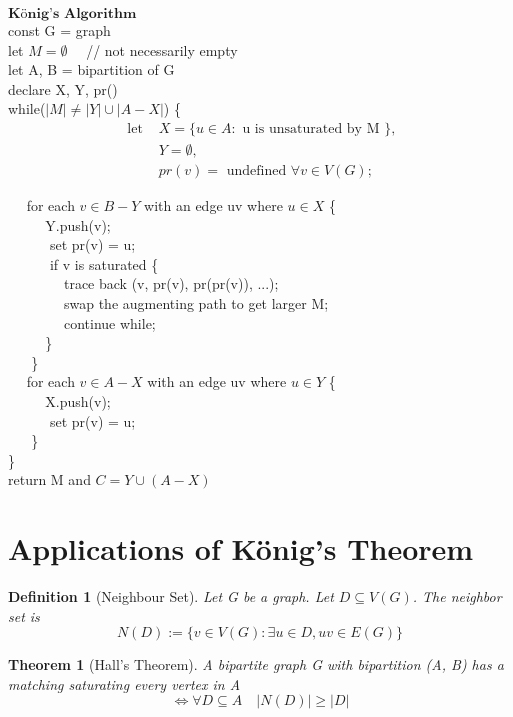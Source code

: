 \documentclass[11pt, oneside]{book}
\theoremstyle{break}
\newtheorem{thm}{Theorem}[section]
\newtheorem{defn}{Definition}[section]
\begin{document}
$\textbf{König's Algorithm}$ \\
const G = graph\\
let $M = \emptyset \quad$ // not necessarily empty\\
let A, B = bipartition of G\\
declare X, Y, pr()\\
while($|M| \neq |Y| \cup |A - X|$) \{
\begin{align*}
	\text{ let } &X = \{ u \in A : \text{ u is unsaturated by M } \}, \\
					   &Y = \emptyset, \\
					   &pr(v) = \text{ undefined } \forall v \in V(G);
\end{align*}

	$\quad$ for each $v \in B - Y$ with an edge uv where $u \in X$ \{\\
		$\text{ }\quad \quad$Y.push(v); \\
		$\text{ }\quad \quad$ set pr(v) = u;\\
		$ $\\
		$\text{ }\quad \quad$ if v is saturated \{\\
			$\text{ }\quad \quad \quad$ trace back (v, pr(v), pr(pr(v)), ...); \\
			$\text{ }\quad \quad \quad$ swap the augmenting path to get larger M;\\
			$\text{ }\quad \quad \quad$ continue while;\\
		$\text{ }\quad \quad$\}\\
	$\text{ }\quad$\}\\

	$\quad$ for each $v \in A - X$ with an edge uv where $u \in Y$ \{\\
		$\text{ }\quad \quad$X.push(v); \\
		$\text{ }\quad \quad$ set pr(v) = u; \\
	$\text{ }\quad$\}\\
\}\\
$ $\\
return M and $C = Y \cup (A - X)$

\section{Applications of König's Theorem}

\begin{defn}[Neighbour Set]
	Let G be a graph. Let $D \subseteq V(G)$. The neighbor set is
	\[
		N(D) := \{v \in V(G) : \exists u \in D, uv \in E(G)\}
	\]
\end{defn}

\begin{thm}[Hall's Theorem]
	A bipartite graph G with bipartition (A, B) has a matching saturating every vertex in A
	\[
		\iff \forall D \subseteq A \quad |N(D)| \geq |D|
	\]
\end{thm}
\end{document}
